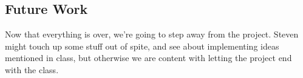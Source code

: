 \documentclass[10pt,conference,onecolumn,compsoc]{IEEEtran}
\begin{document}
\subsection{Future Work}
Now that everything is over, we're going to step away from the project. Steven might touch up some stuff out of spite, and see about implementing ideas mentioned in class, but otherwise we are content with letting the project end with the class.
%
%
%
%
%
%
%
%



\end{document}
